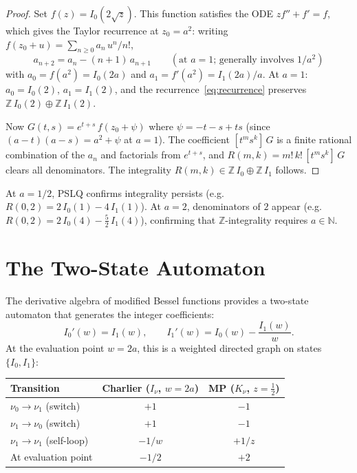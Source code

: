 \documentclass[11pt,a4paper]{article}
\newcommand{\Z}{\mathbb{Z}}
\newcommand{\N}{\mathbb{N}}
\begin{document}
\begin{proof}
Set $f(z) = I_0(2\sqrt{z})$. This function satisfies the ODE
$z f'' + f' = f$, which gives the Taylor recurrence at $z_0 = a^2$:
writing $f(z_0 + u) = \sum_{n \ge 0} a_n\, u^n / n!$,
\begin{equation}\label{eq:recurrence}
  a_{n+2} = a_n - (n+1)\, a_{n+1}
  \qquad (\text{at $a = 1$; generally involves $1/a^2$})
\end{equation}
with $a_0 = f(a^2) = I_0(2a)$ and
$a_1 = f'(a^2) = I_1(2a)/a$. At $a=1$:
$a_0 = I_0(2)$, $a_1 = I_1(2)$, and the
recurrence~\eqref{eq:recurrence} preserves $\Z\, I_0(2) \oplus \Z\, I_1(2)$.

Now $G(t,s) = e^{t+s}\, f(z_0 + \psi)$ where
$\psi = -t - s + ts$ (since $(a-t)(a-s) = a^2 + \psi$ at $a = 1$).
The coefficient $[t^m s^k]\, G$ is a finite rational combination of
the $a_n$ and factorials from $e^{t+s}$, and $R(m,k) = m!\, k!\,
[t^m s^k]\, G$ clears all denominators. The integrality
$R(m,k) \in \Z\, I_0 \oplus \Z\, I_1$ follows.
\end{proof}

At $a = 1/2$, PSLQ confirms integrality persists (e.g.\
$R(0,2) = 2\, I_0(1) - 4\, I_1(1)$). At $a = 2$, denominators of $2$
appear (e.g.\ $R(0,2) = 2\, I_0(4) - \tfrac52\, I_1(4)$), confirming
that $\Z$-integrality requires $a \in \N$.

\section{The Two-State Automaton}

The derivative algebra of modified Bessel functions provides a
two-state automaton that generates the integer coefficients:
\[
  I_0'(w) = I_1(w), \qquad
  I_1'(w) = I_0(w) - \frac{I_1(w)}{w}.
\]
At the evaluation point $w = 2a$, this is a weighted directed graph on
states $\{I_0, I_1\}$:

\begin{center}
\begin{tabular}{lcc}
\toprule
Transition & Charlier ($I_\nu$, $w=2a$) & MP ($K_\nu$, $z=\tfrac12$) \\
\midrule
$\nu_0 \to \nu_1$ (switch) & $+1$ & $-1$ \\
$\nu_1 \to \nu_0$ (switch) & $+1$ & $-1$ \\
$\nu_1 \to \nu_1$ (self-loop) & $-1/w$ & $+1/z$ \\
\midrule
At evaluation point & $-1/2$ & $+2$ \\
\bottomrule
\end{tabular}
\end{center}
\end{document}
